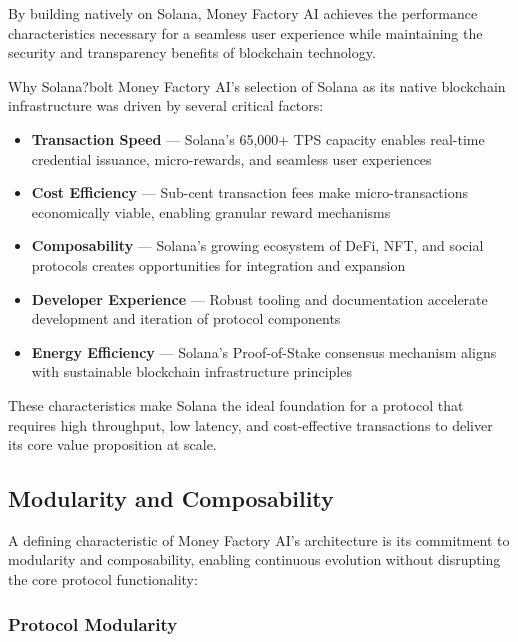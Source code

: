 By building natively on Solana, Money Factory AI achieves the performance characteristics necessary for a seamless user experience while maintaining the security and transparency benefits of blockchain technology.

\begin{mfai-box}{Why Solana?}{bolt}
Money Factory AI's selection of Solana as its native blockchain infrastructure was driven by several critical factors:

\begin{itemize}
    \item \textbf{Transaction Speed} — Solana's 65,000+ TPS capacity enables real-time credential issuance, micro-rewards, and seamless user experiences
    
    \item \textbf{Cost Efficiency} — Sub-cent transaction fees make micro-transactions economically viable, enabling granular reward mechanisms
    
    \item \textbf{Composability} — Solana's growing ecosystem of DeFi, NFT, and social protocols creates opportunities for integration and expansion
    
    \item \textbf{Developer Experience} — Robust tooling and documentation accelerate development and iteration of protocol components
    
    \item \textbf{Energy Efficiency} — Solana's Proof-of-Stake consensus mechanism aligns with sustainable blockchain infrastructure principles
\end{itemize}

These characteristics make Solana the ideal foundation for a protocol that requires high throughput, low latency, and cost-effective transactions to deliver its core value proposition at scale.
\end{mfai-box}

\subsection{Modularity and Composability}

A defining characteristic of Money Factory AI's architecture is its commitment to modularity and composability, enabling continuous evolution without disrupting the core protocol functionality:

\subsubsection*{Protocol Modularity}

